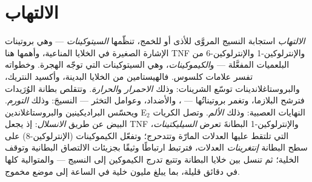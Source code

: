 \section{الالتهاب}

\begin{definition}\label{def:b3:innate-immunity:inflammation}
\emph{الالتهاب} استجابة النسيج المروَّى للأذى أو للخمج،
تنظّمها \emph{السيتوكينات} --- وهي بروتينات الإشارة الصغيرة
في الخلايا المناعية، وأهمها هنا TNF والإنترلوكين-1
والإنترلوكين-6 من البلعميات المفعَّلة ---
و\emph{الكيموكينات}، وهي السيتوكينات التي توجّه الهجرة.
وخطواته تفسر علامات كلسوس. فالهيستامين من الخلايا البدينة،
وأكسيد النتريك، والبروستاغلاندينات توسّع الشرينات: وذلك
\emph{الاحمرار} و\emph{الحرارة}. وتتقلص بطانة الوُرَيدات
فترشح البلازما، وتغمر بروتيناتُها --- ، والأضداد،
وعوامل التخثر --- النسيجَ: وذلك \emph{التورم}. ويحسّس
البراديكينين والبروستاغلاندين E$_{2}$ النهايات العصبية:
وذلك \emph{الألم}. وتصل الكريات البيض عن طريق
\emph{الانسلال}: إذ يجعل TNF والإنترلوكين-1 البطانةَ تعرض
\emph{السيليكتينات}، التي تلتقط عليها العدلات المارّة
وتتدحرج؛ وتفعّل الكيموكينات (الإنترلوكين-8) على سطح البطانة
\emph{إنتغرينات} العدلات، فترتبط ارتباطًا وثيقًا بجزيئات
الالتصاق البطانية وتوقف الخلية؛ ثم تنسل  بين خلايا
البطانة وتتبع تدرج الكيموكين إلى النسيج --- والمتوالية كلها
في دقائق قليلة، بما يبلغ مليون خلية في الساعة إلى موضع
مخموج.
\end{definition}

